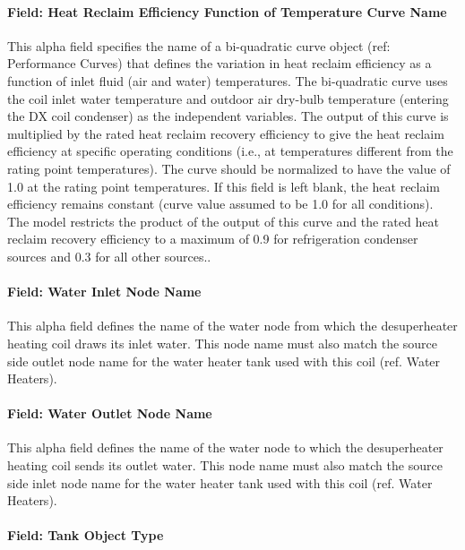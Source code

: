 \paragraph{Field: Heat Reclaim Efficiency Function of Temperature Curve Name}\label{field-heat-reclaim-efficiency-function-of-temperature-curve-name}

This alpha field specifies the name of a bi-quadratic curve object (ref: Performance Curves) that defines the variation in heat reclaim efficiency as a function of inlet fluid (air and water) temperatures. The bi-quadratic curve uses the coil inlet water temperature and outdoor air dry-bulb temperature (entering the DX coil condenser) as the independent variables. The output of this curve is multiplied by the rated heat reclaim recovery efficiency to give the heat reclaim efficiency at specific operating conditions (i.e., at temperatures different from the rating point temperatures). The curve should be normalized to have the value of 1.0 at the rating point temperatures. If this field is left blank, the heat reclaim efficiency remains constant (curve value assumed to be 1.0 for all conditions). The model restricts the product of the output of this curve and the rated heat reclaim recovery efficiency to a maximum of 0.9 for refrigeration condenser sources and 0.3 for all other sources..

\paragraph{Field: Water Inlet Node Name}\label{field-water-inlet-node-name-4-000}

This alpha field defines the name of the water node from which the desuperheater heating coil draws its inlet water. This node name must also match the source side outlet node name for the water heater tank used with this coil (ref. Water Heaters).

\paragraph{Field: Water Outlet Node Name}\label{field-water-outlet-node-name-4-000}

This alpha field defines the name of the water node to which the desuperheater heating coil sends its outlet water. This node name must also match the source side inlet node name for the water heater tank used with this coil (ref. Water Heaters).

\paragraph{Field: Tank Object Type}\label{field-tank-object-type}

